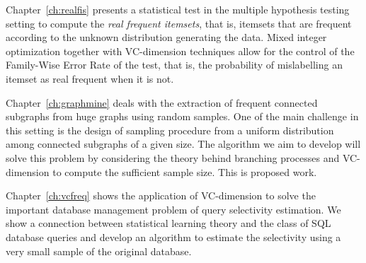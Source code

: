 Chapter~\ref{ch:realfis} presents a statistical test in the multiple hypothesis
testing setting to compute the \emph{real frequent itemsets}, that is, itemsets
that are frequent according to the unknown distribution generating the data.
Mixed integer optimization together with VC-dimension techniques allow for the
control of the Family-Wise Error Rate of the test, that is, the probability of
mislabelling an itemset as real frequent when it is not.

Chapter~\ref{ch:graphmine} deals with the extraction of frequent connected
subgraphs from huge graphs using random samples. One of the main challenge in
this setting is the design of sampling procedure from a uniform
distribution among connected subgraphs of a given size. The algorithm we aim to
develop will solve this problem by considering the theory behind branching
processes and VC-dimension to compute the sufficient sample size. This is
proposed work.

Chapter~\ref{ch:vcfreq} shows the application of VC-dimension to solve the
important database management problem of query selectivity estimation. We show a
connection between statistical learning theory and the class of SQL database
queries and develop an algorithm to estimate the selectivity using a very small
sample of the original database.

